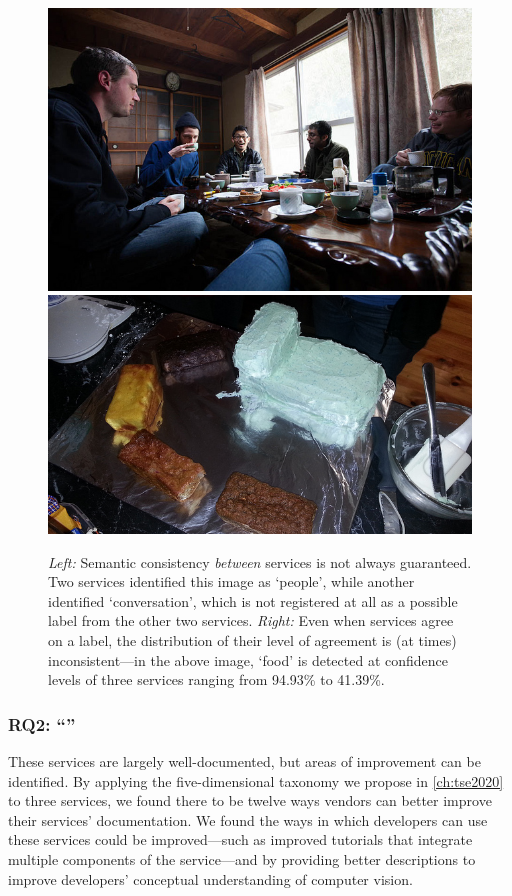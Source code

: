 \begin{figure}[h]
    \centering
    \includegraphics[width=0.45\linewidth]{mainmatter/publications/figures/icsme2019/000000009590.jpg}
    \hfill
    \includegraphics[width=0.45\linewidth]{mainmatter/publications/figures/icsme2019/000000095707.jpg}
    \caption[Results from computer vision services can be disparate and non-static]{\textit{Left:} Semantic consistency \textit{between} services is not always guaranteed. Two services identified this image as `people', while another identified `conversation', which is not registered at all as a possible label from the other two services. \textit{Right:} Even when services agree on a label, the distribution of their level of agreement is (at times) inconsistent---in the above image, `food' is detected at confidence levels of three services ranging from 94.93\% to 41.39\%.}
    \label{fig:conclusion:consistency}
\end{figure}

\subsubsection[Answering RQ2]{RQ2: ``\RQTwoTextDocumentation{}''}
\begin{callout}
These services are largely well-documented, but areas of improvement can be identified. By applying the five-dimensional taxonomy we propose in \cref{ch:tse2020} to three services, we found there to be  twelve ways vendors can better improve their services' documentation. We found the ways in which developers can use these services could be improved---such as improved tutorials that integrate \textup{multiple} components of the service---and by providing better descriptions to improve developers' conceptual understanding of computer vision.
\end{callout}

